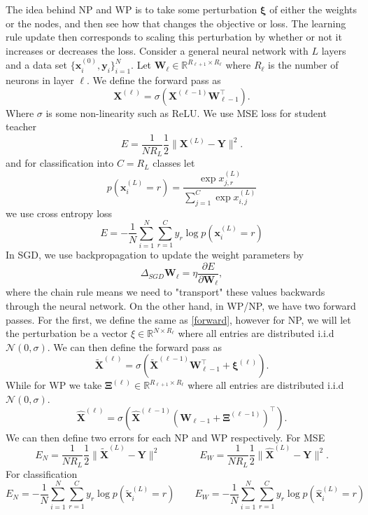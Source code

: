 \documentclass{article}
\def\R{\mathbb{R}}
\def\*#1{\mathbf{#1}}
\begin{document}
The idea behind NP and WP is to take some perturbation $\*\xi$ of either
the weights or the nodes, and then see how that changes the objective or loss. The learning rule update
then corresponds to scaling this perturbation by whether or not it increases or decreases
the loss. Consider a general neural network with $L$ layers and a data set $\{\*x_i^{(0)},\*y_i\}_{i=1}^N$. 
Let $\*W_{\ell} \in \R^{R_{\ell+1} \times R_{\ell}}$ where $R_\ell$ is the number of 
neurons in layer $\ell$. We define the forward pass as
\begin{equation}\label{forward}\*X^{(\ell)} = \sigma\left( \*X^{(\ell-1)}\*W_{\ell-1}^\top\right).\end{equation}
Where $\sigma$ is some non-linearity such as ReLU. We use MSE loss for student teacher
\begin{equation}
\label{mseloss}
E = \frac{1}{NR_L}\frac 12 \| \*X^{(L)}- \*Y\|^2.
\end{equation}
and for classification into $C = R_L$ classes let 
\begin{equation}
\label{crossentropy}
p(\*x_i^{(L)} = r) = \frac{\exp x_{j,r}^{(L)}}{\sum_{j=1}^C \exp x_{i,j}^{(L)}}
\end{equation}
we use cross entropy loss
\[E = -\frac 1N \sum_{i=1}^N \sum_{r=1}^C y_r \log p(\*x_i^{(L)} = r) \]
In SGD, we use backpropagation to update the weight parameters by 
\[\Delta_{SGD} \* W_{\ell} = \eta\frac{\partial E}{\partial \*W_{\ell}},\] 
where the chain rule means we 
need to "transport" these values backwards through the neural network. On the other 
hand, in WP/NP, we have two forward passes. For the first, we define the same as \ref{forward}, 
however for NP, we will let the perturbation be a vector $\xi \in \R^{N\times R_{\ell}}$ where all entries are distributed 
i.i.d $\mathcal{N}(0,\sigma)$. We can then define the forward pass as 
\[ \widetilde{\*X}^{(\ell)} = \sigma\left(\widetilde{\*X}^{(\ell-1)}\*W_{\ell -1}^\top + \*\xi^{(\ell)} \right).\]
While for WP we take $\*\Xi^{(\ell)} \in \R^{R_{\ell + 1 }\times R_\ell}$ where all entries are distributed 
i.i.d $\mathcal{N}(0,\sigma)$. 
\[ \hat{\*X}^{(\ell)} = \sigma\left( \hat{\*X}^{(\ell-1)}\left(\*W_{\ell -1} + \*\Xi^{(\ell-1)}\right)^\top  \right).\]
We can then define two errors for each NP and WP respectively. For MSE
\[ E_N = \frac{1}{NR_L} \frac 12 \| \widetilde{\* X}^{(L)} - \* Y \|^2 \qquad\qquad E_W = \frac{1}{NR_L} \frac 12 \| \hat{\* X}^{(L)} - \* Y \|^2. \]
For classification
\[E_N  =  -\frac 1N \sum_{i=1}^N \sum_{r=1}^C y_r \log p(\widetilde{\*x}_i^{(L)} = r) \qquad E_W =  -\frac 1N \sum_{i=1}^N \sum_{r=1}^C y_r \log p(\hat{\*x}_i^{(L)} = r)\]
\end{document}
